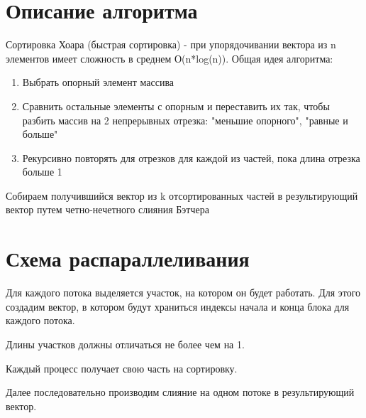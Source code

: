 \documentclass{report}
\begin{document}
\newpage

\section*{Описание алгоритма}
\par Сортировка Хоара (быстрая сортировка) - при упорядочивании вектора из n элементов имеет сложность в среднем О(n*log(n)). Общая идея алгоритма: 
\begin{enumerate}
\item Выбрать опорный элемент массива
\item Сравнить остальные элементы с опорным и переставить их так, чтобы разбить массив на 2 непрерывных отрезка:
"меньшие опорного", "равные и больше"
\item Рекурсивно повторять для отрезков для каждой из частей, пока длина отрезка больше 1
\end{enumerate}
\par Собираем получившийся вектор из k отсортированных частей в результирующий вектор путем четно-нечетного слияния Бэтчера
\newpage

\section*{Схема распараллеливания}
\par Для каждого потока выделяется участок, на котором он будет работать. Для этого создадим вектор, в котором будут
храниться индексы начала и конца блока для каждого потока. 
\par Длины участков должны отличаться не более чем на 1.
\par Каждый процесс получает свою часть на сортировку.
\par Далее последовательно производим слияние на одном потоке в результирующий вектор.

\newpage

\end{document}
